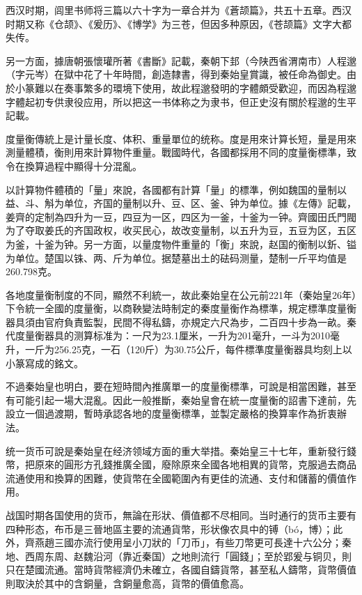 西汉时期，闾里书师将三篇以六十字为一章合并为《蒼颉篇》，共五十五章。西汉时期又称《仓颉》、《爰历》、《博学》为三苍，但因多种原因，《苍颉篇》文字大都失传。

另一方面，據唐朝張懷瓘所著《書斷》記載，秦朝下邽（今陕西省渭南市）人程邈（字元岑）在獄中花了十年時間，創造隸書，得到秦始皇賞識，被任命為御史。由於小篆難以在奏事繁多的環境下使用，故此程邈發明的字體頗受歡迎，而因為程邈字體起初专供隶役应用，所以把这一书体称之为隶书，但正史沒有關於程邈的生平記載。

度量衡傳統上是计量长度、体积、重量單位的统称。度是用來计算长短，量是用來測量體積，衡則用來計算物件重量。戰國時代，各國都採用不同的度量衡標準，致令在換算過程中顯得十分混亂。

以計算物件體積的「量」來說，各國都有計算「量」的標準，例如魏国的量制以益、斗、斛为单位，齐国的量制以升、豆、区、釜、钟为单位。據《左傳》記載，姜齊的定制為四升为一豆，四豆为一区，四区为一釜，十釜为一钟。齊國田氏門閥为了夺取姜氏的齐国政权，收买民心，故改变量制，以五升为豆，五豆为区，五区为釜，十釜为钟。另一方面，以量度物件重量的「衡」來說，赵国的衡制以釿、镒为单位。楚国以铢、两、斤为单位。据楚墓出土的砝码测量，楚制一斤平均值是260.798克。

各地度量衡制度的不同，顯然不利統一，故此秦始皇在公元前221年（秦始皇26年）下令統一全國的度量衡，以商鞅變法時制定的秦度量衡作為標準，規定標準度量衡器具須由官府負責監製，民間不得私鑄，亦規定六尺為步，二百四十步為一畝。秦代度量衡器具的测算标准为：一尺为23.1厘米，一升为201毫升，一斗为2010毫升，一斤为256.25克，一石（120斤）为30.75公斤，每件標準度量衡器具均刻上以小篆寫成的銘文。

不過秦始皇也明白，要在短時間內推廣單一的度量衡標準，可說是相當困難，甚至有可能引起一場大混亂。因此一般推斷，秦始皇會在統一度量衡的詔書下達前，先設立一個過渡期，暫時承認各地的度量衡標準，並製定嚴格的換算率作為折衷辦法。

统一货币可說是秦始皇在经济领域方面的重大举措。秦始皇三十七年，重新發行錢幣，把原來的圓形方孔錢推廣全國，廢除原來全國各地相異的貨幣，克服過去商品流通使用和換算的困難，使貨幣在全國範圍內有更佳的流通、支付和儲蓄的價值作用。

战国时期各国使用的货币，無論在形狀、價值都不尽相同。当时通行的货币主要有四种形态，布币是三晉地區主要的流通貨幣，形状像农具中的镈（bó，博）；此外，齊燕趙三國亦流行使用呈小刀狀的「刀币」，有些刀幣更可長達十六公分；秦地、西周东周、赵魏沿河（靠近秦国）之地則流行「圓錢」；至於郢爰与铜贝，則只在楚國流通。當時貨幣經濟仍未確立，各國自鑄貨幣，甚至私人鑄幣，貨幣價值則取決於其中的含銅量，含銅量愈高，貨幣的價值愈高。

